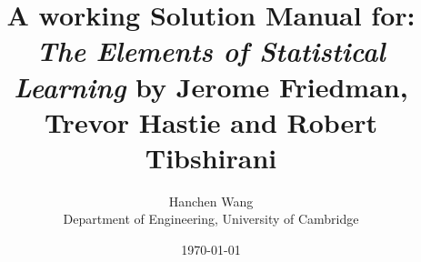 \documentclass[letterpaper,oneside]{book}
\numberwithin{exercisectr}{chapter}
\numberwithin{theorem}{chapter} %
\numberwithin{lemma}{chapter} %
\numberwithin{proposition}{chapter} %
\begin{document}
\doublespacing
\renewcommand{\labelenumi}{(\arabic{enumi})}

\title{
  { A working Solution Manual for: \emph{The Elements of Statistical
  Learning} by Jerome Friedman, Trevor Hastie and Robert Tibshirani}
}

\author{
  Hanchen Wang\\%
  Department of Engineering, University of Cambridge\\
}
\date{\today}
\maketitle

\onehalfspacing
{}
\tableofcontents

{}


\setcounter{chapter}{1}


\appendix
%


\end{document}

